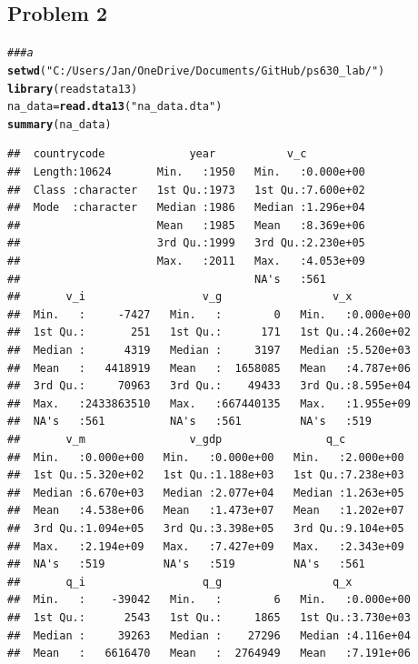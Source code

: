 \documentclass[12pt]{article}\usepackage[]{graphicx}\usepackage[]{color}
\makeatletter
\newcommand{\hlstr}[1]{\textcolor[rgb]{0.192,0.494,0.8}{#1}}%
\newcommand{\hlcom}[1]{\textcolor[rgb]{0.678,0.584,0.686}{\textit{#1}}}%
\newcommand{\hlstd}[1]{\textcolor[rgb]{0.345,0.345,0.345}{#1}}%
\newcommand{\hlkwb}[1]{\textcolor[rgb]{0.69,0.353,0.396}{#1}}%
\newcommand{\hlkwd}[1]{\textcolor[rgb]{0.737,0.353,0.396}{\textbf{#1}}}%
\newenvironment{kframe}{%
 \def\at@end@of@kframe{}%
 \ifinner\ifhmode%
  \def\at@end@of@kframe{\end{minipage}}%
  \begin{minipage}{\columnwidth}%
 \fi\fi%
 \def\FrameCommand##1{\hskip\@totalleftmargin \hskip-\fboxsep
 \colorbox{shadecolor}{##1}\hskip-\fboxsep
     \hskip-\linewidth \hskip-\@totalleftmargin \hskip\columnwidth}%
 \MakeFramed {\advance\hsize-\width
   \@totalleftmargin\z@ \linewidth\hsize
   \@setminipage}}%
 {\par\unskip\endMakeFramed%
 \at@end@of@kframe}
\newenvironment{knitrout}{}{} %
\makeatother
\begin{document}
\subsection*{Problem 2}

\begin{knitrout}
\color{fgcolor}\begin{kframe}
\begin{alltt}
\hlcom{### a}
\hlkwd{setwd}\hlstd{(}\hlstr{"C:/Users/Jan/OneDrive/Documents/GitHub/ps630_lab/"}\hlstd{)}
\hlkwd{library}\hlstd{(readstata13)}
\hlstd{na_data} \hlkwb{=} \hlkwd{read.dta13}\hlstd{(}\hlstr{"na_data.dta"}\hlstd{)}
\hlkwd{summary}\hlstd{(na_data)}
\end{alltt}
\begin{verbatim}
##  countrycode             year           v_c           
##  Length:10624       Min.   :1950   Min.   :0.000e+00  
##  Class :character   1st Qu.:1973   1st Qu.:7.600e+02  
##  Mode  :character   Median :1986   Median :1.296e+04  
##                     Mean   :1985   Mean   :8.369e+06  
##                     3rd Qu.:1999   3rd Qu.:2.230e+05  
##                     Max.   :2011   Max.   :4.053e+09  
##                                    NA's   :561        
##       v_i                  v_g                 v_x           
##  Min.   :     -7427   Min.   :        0   Min.   :0.000e+00  
##  1st Qu.:       251   1st Qu.:      171   1st Qu.:4.260e+02  
##  Median :      4319   Median :     3197   Median :5.520e+03  
##  Mean   :   4418919   Mean   :  1658085   Mean   :4.787e+06  
##  3rd Qu.:     70963   3rd Qu.:    49433   3rd Qu.:8.595e+04  
##  Max.   :2433863510   Max.   :667440135   Max.   :1.955e+09  
##  NA's   :561          NA's   :561         NA's   :519        
##       v_m                v_gdp                q_c           
##  Min.   :0.000e+00   Min.   :0.000e+00   Min.   :2.000e+00  
##  1st Qu.:5.320e+02   1st Qu.:1.188e+03   1st Qu.:7.238e+03  
##  Median :6.670e+03   Median :2.077e+04   Median :1.263e+05  
##  Mean   :4.538e+06   Mean   :1.473e+07   Mean   :1.202e+07  
##  3rd Qu.:1.094e+05   3rd Qu.:3.398e+05   3rd Qu.:9.104e+05  
##  Max.   :2.194e+09   Max.   :7.427e+09   Max.   :2.343e+09  
##  NA's   :519         NA's   :519         NA's   :561        
##       q_i                  q_g                 q_x           
##  Min.   :    -39042   Min.   :        6   Min.   :0.000e+00  
##  1st Qu.:      2543   1st Qu.:     1865   1st Qu.:3.730e+03  
##  Median :     39263   Median :    27296   Median :4.116e+04  
##  Mean   :   6616470   Mean   :  2764949   Mean   :7.191e+06  

\end{verbatim}
\end{kframe}
\end{knitrout}
\end{document}
